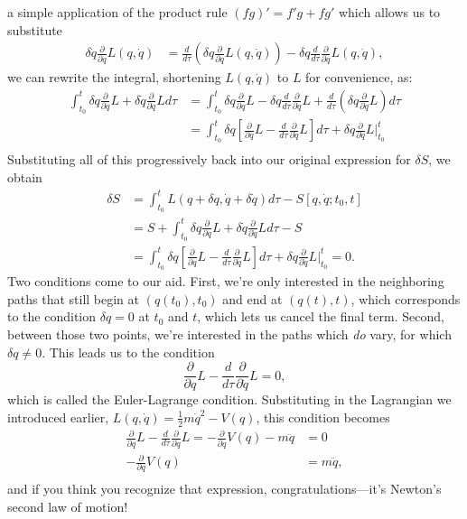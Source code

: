 \documentclass{amsart}
\newcommand{\md}{d}		%
\newcommand{\mderiv}[1]{\frac{\md}{\md {#1}}} %
\newcommand{\mpderiv}[1]{\frac{\partial}{\partial {#1}}} %
\newcommand{\qv}{q}
\begin{document}
a simple application of the product rule $(fg)' = f'g + fg'$ which allows us to substitute
\begin{align*}
\delta \dot{\qv} \mpderiv{\dot{\qv}}L(\qv,\dot{\qv}) &= \mderiv{\tau}{\left(\delta \qv \mpderiv{\dot{\qv}}L(\qv,\dot{\qv})\right)} - \delta \qv \mderiv{\tau}{\mpderiv{\dot{\qv}}L(\qv,\dot{\qv})},
\end{align*}
we can rewrite the integral, shortening $L(\qv,\dot{\qv})$ to $L$ for convenience, as:
\begin{align*}
\int_{t_0}^{t} \delta \qv \mpderiv{\qv} L + \delta \dot{\qv} \mpderiv{\dot{\qv}} L \md \tau
&= \int_{t_0}^{t} \delta \qv \mpderiv{\qv} L - \delta \qv \mderiv{\tau}{\mpderiv{\dot{\qv}} L} + \mderiv{\tau}{\left(\delta \qv \mpderiv{\dot{\qv}} L \right)} \md \tau\\
&= \int_{t_0}^{t} \delta \qv \left[ \mpderiv{\qv} L - \mderiv{\tau}{\mpderiv{\dot{\qv}} L}\right] \md \tau + \delta \qv \mpderiv{\dot{\qv}} L \Big|_{t_0}^{t}\\
\end{align*}
Substituting all of this progressively back into our original expression for $\delta S$, we obtain
\begin{align*}
\delta S 
&= \int_{t_0}^{t} L(\qv + \delta \qv,\dot{\qv} + \delta \dot{\qv}) \md \tau - S[\qv, \dot{\qv}; t_0, t]\\
&= S + \int_{t_0}^{t} \delta \qv \mpderiv{\qv}L + \delta \dot{\qv} \mpderiv{\dot{\qv}}L \md \tau - S\\
&= \int_{t_0}^{t} \delta \qv \left[ \mpderiv{\qv} L - \mderiv{\tau}{\mpderiv{\dot{\qv}} L}\right] \md \tau + \delta \qv \mpderiv{\dot{\qv}} L \Big|_{t_0}^{t} = 0.
\end{align*}
Two conditions come to our aid.  First, we're only interested in the neighboring paths that still begin at $(\qv(t_0),t_0)$ and end at $(\qv(t),t)$, which corresponds to the condition $\delta \qv = 0$ at $t_0$ and $t$, which lets us cancel the final term.  Second, between those two points, we're interested in the paths which \emph{do} vary, for which $\delta \qv \neq 0$.  This leads us to the condition
\begin{equation*}
\mpderiv{\qv} L - \mderiv{\tau}{\mpderiv{\dot{\qv}} L} = 0,
\end{equation*}
which is called the Euler-Lagrange condition.  Substituting in the Lagrangian we introduced earlier, $L(\qv, \dot{\qv}) = \frac{1}{2} m \dot{\qv}^2 - V(\qv)$, this condition becomes
\begin{align*}
\mpderiv{\qv} L - \mderiv{\tau}{\mpderiv{\dot{\qv}} L} = -\mpderiv{\qv}{V(q)} - m \ddot{\qv} &= 0\\
-\mpderiv{\qv}{V(q)} &= m \ddot{\qv},\\
\end{align*}
and if you think you recognize that expression, congratulations---it's Newton's second law of motion!
\end{document}
